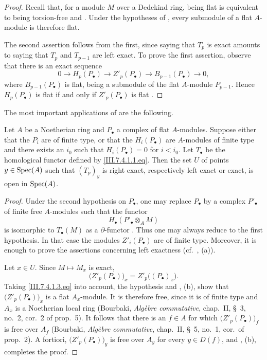 \begin{proof}
Recall that, for a module $M$ over a Dedekind ring, being flat
is equivalent to being torsion-free  and
.  Under the hypotheses of
, every submodule of a flat $A$-module is
therefore flat.

The second assertion follows from the first, since saying that
$T_p$ is exact amounts to saying that $T_p$ and $T_{p-1}$ are
left exact.  To prove the first assertion, observe that there
is an exact sequence
\[
  0
  \longrightarrow H_p(P_\bullet)
  \longrightarrow Z'_p(P_\bullet)
  \longrightarrow B_{p-1}(P_\bullet)
  \longrightarrow 0,
\]
where $B_{p-1}(P_\bullet)$ is flat, being a submodule of the
flat $A$-module $P_{p-1}$.  Hence $H_p(P_\bullet)$ is flat if
and only if $Z'_p(P_\bullet)$ is flat
.
\end{proof}

The most important applications of  are the
following.

\begin{proposition}[7.4.4]
\label{III.7.4.4}
Let $A$ be a Noetherian ring and $P_\bullet$ a complex of flat
$A$-modules.  Suppose either that the $P_i$ are of finite
type, or that the $H_i(P_\bullet)$ are $A$-modules of finite
type and there exists an $i_0$ such that
$H_i(P_\bullet)=0$ for $i<i_0$.  Let $T_\bullet$ be the
homological functor defined by \eqref{III.7.4.1.1.eq}.  Then
the set $U$ of points $y\in\operatorname{Spec}(A)$ such that $(T_p)_y$
 is right exact, respectively left exact or
exact, is open in $\operatorname{Spec}(A)$.
\end{proposition}

\begin{proof}
Under the second hypothesis on $P_\bullet$, one may replace
$P_\bullet$ by a complex $P'_\bullet$ of finite free
$A$-modules such that the functor
\[
  H_\bullet(P'_\bullet\otimes_A M)
\]
is isomorphic to $T_\bullet(M)$ as a $\partial$-functor
.  Thus one may always reduce to the first
hypothesis.  In that case the modules $Z'_i(P_\bullet)$ are of
finite type.  Moreover, it is enough to prove the assertions
concerning left exactness (cf.\ , (a)).

Let $x\in U$.  Since $M\mapsto M_x$ is exact,
\[
  \bigl(Z'_p(P_\bullet)\bigr)_x
  =
  Z'_p\bigl((P_\bullet)_x\bigr).
\]
Taking \eqref{III.7.4.1.3.eq} into account, the hypothesis and
, (b), show that
$\bigl(Z'_p(P_\bullet)\bigr)_x$ is a flat $A_x$-module.  It is
therefore free, since it is of finite type and $A_x$ is a
Noetherian local ring (Bourbaki,
\emph{Alg\`ebre commutative}, chap.~II, \S~3, no.~2, cor.~2
of prop.~5).  It follows that there is an $f\in A$ for which
$\bigl(Z'_p(P_\bullet)\bigr)_f$ is free over $A_f$
(Bourbaki, \emph{Alg\`ebre commutative}, chap.~II, \S~5,
no.~1, cor.\ of prop.~2).  A fortiori,
$\bigl(Z'_p(P_\bullet)\bigr)_y$ is free over $A_y$ for every
$y\in D(f)$, and , (b), completes the proof.
\end{proof}

